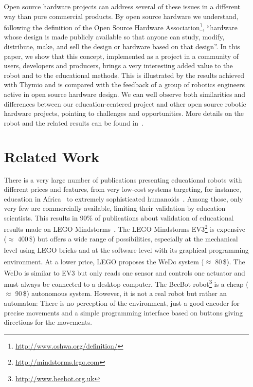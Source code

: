 \documentclass[letterpaper, 10 pt, conference]{ieeeconf}  %
\begin{document}
Open source hardware projects can address several of these issues in a different way than pure commercial products. 
By open source hardware we understand, following the definition of the Open Source Hardware Association\footnote{\url{http://www.oshwa.org/definition/}}, ``hardware whose design is made publicly available so that anyone can study, modify, distribute, make, and sell the design or hardware based on that design''.
In this paper, we show that this concept, implemented as a project in a community of users, developers and producers, brings a very interesting added value to the robot and to the educational methods. 
This is illustrated by the results achieved with Thymio and is compared with the feedback of a group of robotics engineers active in open source hardware design.
We can well observe both similarities and differences between our education-centered project and other open source robotic hardware projects, pointing to challenges and opportunities.
More details on the robot and the related results can be found in~\cite{RiedoPhD, magnenat2014}.  

\section{Related Work}

There is a very large number of publications presenting educational robots with different prices and features, from very low-cost systems targeting, for instance, education in Africa~\cite{Rubenstein2015,Gyebi2015} to extremely sophisticated humanoids~\cite{Hood2015,Mazzoni2016}.
Among those, only very few are commercially available, limiting their validation by education scientists.
This results in 90\% of publications about validation of educational results made on LEGO\textsuperscript{\textregistered} Mindstorms\textsuperscript{\textregistered}~\cite{benitti2012exploring}.
The LEGO\textsuperscript{\textregistered} Mindstorms\textsuperscript{\textregistered} EV3\footnote{\url{http://mindstorms.lego.com}} is expensive ($\approx$ 400\,\$) but offers a wide range of possibilities, especially at the mechanical level using LEGO\textsuperscript{\textregistered} bricks and at the software level with its graphical programming environment. 
At a lower price, LEGO\textsuperscript{\textregistered} proposes the WeDo\textsuperscript{\textregistered} system ($\approx$ 80\,\$).
The WeDo\textsuperscript{\textregistered} is similar to EV3 but only reads one sensor and controls one actuator and must always be connected to a desktop computer.
The BeeBot robot\footnote{\url{http://www.beebot.org.uk}} is a cheap ($\approx$ 90\,\$) autonomous system.
However, it is not a real robot but rather an automaton: There is no perception of the environment, just a good encoder for precise movements and a simple programming interface based on buttons giving directions for the movements.
\end{document}
